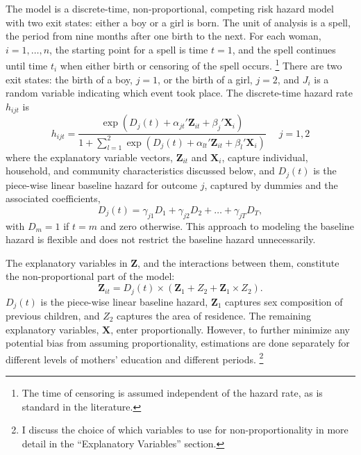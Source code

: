\documentclass[12pt,letterpaper]{article}
\begin{document}
The model is a discrete-time, non-proportional, competing risk hazard model with two exit 
states: either a boy or a girl is born.
The unit of analysis is a spell, the period from nine months after one birth to the next.
For each woman, $i=1,\ldots,n$, the starting point for a spell is time $t=1$, and 
the spell continues until time $t_i$ when either birth or censoring of the spell 
occurs.%
\footnote{
The time of censoring is assumed independent of the hazard rate,
as is standard in the literature.
}
There are two exit states: the birth of a boy, $j=1$, or the birth of a girl, $j=2$, and 
$J_i$ is a random variable indicating which event took place.
The discrete-time hazard rate $h_{ijt}$ is 
\begin{equation}
 h_{ijt} = \frac{\exp(D_j(t) + \alpha_{jt}'\mathbf{Z}_{it} + \beta_j'\mathbf{X}_{i})} 
 {1 + \sum_{l=1}^2 \exp(D_j(t) + \alpha_{lt}'\mathbf{Z}_{it} + \beta_l'\mathbf{X}_{i})} \: \: \; \; \;  j = 1,2
 \label{eq:hazard}
\end{equation}
where the explanatory variable vectors, $\mathbf{Z}_{it}$ and $\mathbf{X}_{i}$, capture 
individual, household, and community characteristics discussed below,
and $D_{j}(t)$ is the piece-wise linear baseline hazard for outcome $j$, captured
by dummies and the associated coefficients,
\begin{equation}
D_j(t) = \gamma_{j1} D_1 + \gamma_{j2} D_2 + \ldots + \gamma_{jT} D_T,
\end{equation}
with $D_m = 1$ if $t=m$ and zero otherwise.
This approach to modeling the baseline hazard is flexible and does not restrict the 
baseline hazard unnecessarily.

The explanatory variables in $\mathbf{Z}$, and the interactions between them, 
constitute the non-proportional part of the model:
\begin{equation}
 \mathbf{Z}_{it} = D_j(t) \times (\mathbf{Z}_1 + Z_2 + \mathbf{Z}_1 \times Z_2).
\end{equation}
$D_j(t)$ is the piece-wise linear baseline hazard, $\mathbf{Z}_1$ captures sex 
composition of previous children, and $Z_2$ captures the area of residence.
The remaining explanatory variables, $\mathbf{X}$, enter proportionally.
However, to further minimize any potential bias from assuming proportionality, estimations 
are done separately for different levels of mothers' education and different 
periods.%
\footnote{
I discuss the choice of which variables to use for non-proportionality in more detail
in the ``Explanatory Variables'' section.
}
\end{document}
